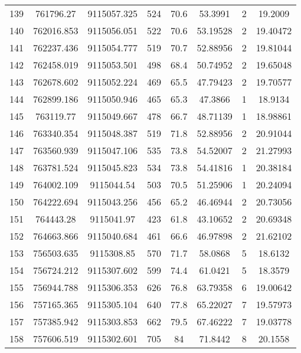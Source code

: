 \begin{longtable}{cccccccc}
139  & 761796.27       & 9115057.325      & 524     & 70.6  & 53.3991  & 2  & 19.2009  \\
140  & 762016.853      & 9115056.051      & 522     & 70.6  & 53.19528 & 2  & 19.40472 \\
141  & 762237.436      & 9115054.777      & 519     & 70.7  & 52.88956 & 2  & 19.81044 \\
142  & 762458.019      & 9115053.501      & 498     & 68.4  & 50.74952 & 2  & 19.65048 \\
143  & 762678.602      & 9115052.224      & 469     & 65.5  & 47.79423 & 2  & 19.70577 \\
144  & 762899.186      & 9115050.946      & 465     & 65.3  & 47.3866  & 1  & 18.9134  \\
145  & 763119.77       & 9115049.667      & 478     & 66.7  & 48.71139 & 1  & 18.98861 \\
146  & 763340.354      & 9115048.387      & 519     & 71.8  & 52.88956 & 2  & 20.91044 \\
147  & 763560.939      & 9115047.106      & 535     & 73.8  & 54.52007 & 2  & 21.27993 \\
148  & 763781.524      & 9115045.823      & 534     & 73.8  & 54.41816 & 1  & 20.38184 \\
149  & 764002.109      & 9115044.54       & 503     & 70.5  & 51.25906 & 1  & 20.24094 \\
150  & 764222.694      & 9115043.256      & 456     & 65.2  & 46.46944 & 2  & 20.73056 \\
151  & 764443.28       & 9115041.97       & 423     & 61.8  & 43.10652 & 2  & 20.69348 \\
152  & 764663.866      & 9115040.684      & 461     & 66.6  & 46.97898 & 2  & 21.62102 \\
153  & 756503.635      & 9115308.85       & 570     & 71.7  & 58.0868  & 5  & 18.6132  \\
154  & 756724.212      & 9115307.602      & 599     & 74.4  & 61.0421  & 5  & 18.3579  \\
155  & 756944.788      & 9115306.353      & 626     & 76.8  & 63.79358 & 6  & 19.00642 \\
156  & 757165.365      & 9115305.104      & 640     & 77.8  & 65.22027 & 7  & 19.57973 \\
157  & 757385.942      & 9115303.853      & 662     & 79.5  & 67.46222 & 7  & 19.03778 \\
158  & 757606.519      & 9115302.601      & 705     & 84    & 71.8442  & 8  & 20.1558  \\

\end{longtable}
